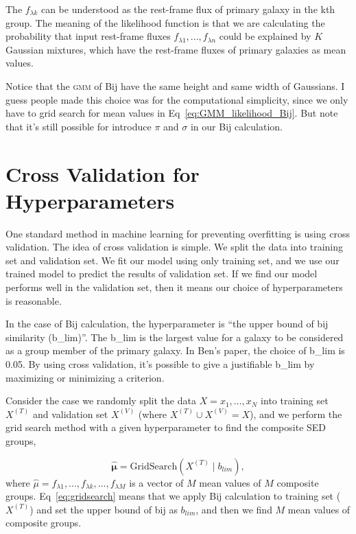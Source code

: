\documentclass[12pt,letterpaper]{article}
\begin{document}
The $f_{\lambda k}$ can be understood as the rest-frame flux
of primary galaxy in the kth group.
The meaning of the likelihood function is that we are calculating the
probability that input rest-frame fluxes 
$f_{\lambda 1}, ..., f_{\lambda n}$
could be explained by $K$ Gaussian mixtures, 
which have the rest-frame fluxes of primary galaxies as mean values.

Notice that the \textsc{gmm} of Bij have the same height and same width of Gaussians.
I guess people made this choice was for the computational simplicity, 
since we only have to grid search for mean values in Eq~\ref{eq:GMM_likelihood_Bij}.
But note that it's still possible for introduce $\pi$ and $\sigma$ in our Bij calculation.

\section*{Cross Validation for Hyperparameters}

One standard method in machine learning for preventing overfitting is using cross validation.
The idea of cross validation is simple.
We split the data into training set and validation set.
We fit our model using only training set, and we use our trained model to predict the results of validation set.
If we find our model performs well in the validation set, then it means our choice of hyperparameters is reasonable. 

In the case of Bij calculation, the hyperparameter is ``the upper bound of bij similarity (b\_lim)''.
The b\_lim is the largest value for a galaxy to be considered as a group member of the primary galaxy.
In Ben's paper, the choice of b\_lim is 0.05.
By using cross validation, it's possible to give a justifiable b\_lim by maximizing or minimizing a criterion.

Consider the case we randomly split the data $X = x_1, ..., x_N$ into training set $X^{(T)}$ and validation set $X^{(V)}$ (where $X^{(T)} \cup X^{(V)} = X$), and we perform the grid search method with a given hyperparameter to find the composite SED groups,

\begin{equation}
    \hat{ \mathbf{\mu} } = 
    \mathrm{GridSearch}(X^{(T)} \mid b_{lim}),
    \label{eq:gridsearch}
\end{equation}
where $\hat{\mu} = f_{\lambda 1}, ..., f_{\lambda k}, ..., f_{\lambda M}$ is a vector of $M$ mean values of $M$ composite groups.
Eq~\ref{eq:gridsearch} means that we apply Bij calculation to training set ($X^{(T)}$) and set the upper bound of bij as $b_{lim}$, and then we find $M$ mean values of composite groups.
\end{document}
